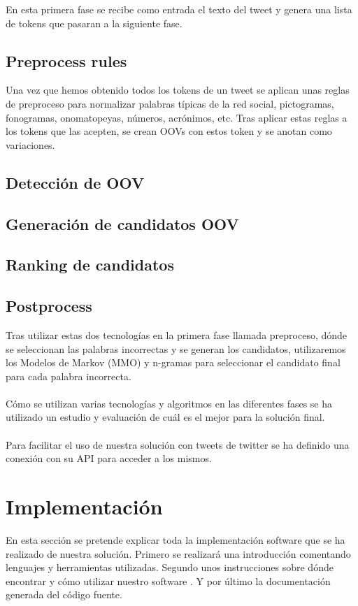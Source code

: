 \documentclass[spanish,12pt, a4paper,twoside]{paper}
\let\oldsection\section
\def\section{\cleardoublepage\oldsection}
\begin{document}
En esta primera fase se recibe como entrada el texto del tweet y genera una lista de tokens que pasaran a la siguiente fase.

\subsection{Preprocess rules}\label{sec:preprocessrules}
Una vez que hemos obtenido todos los tokens de un tweet se aplican unas reglas de preproceso para normalizar palabras típicas de la red social, pictogramas, fonogramas, onomatopeyas, números, acrónimos, etc. Tras aplicar estas reglas a los tokens que las acepten, se crean OOVs con estos token y se anotan como variaciones.

\subsection{Detección de OOV}\label{sec:detecciondeoov}


\subsection{Generación de candidatos OOV}\label{sec:generaciondecandidatosoov}
\subsection{Ranking de candidatos}\label{sec:rankingdecandidatos}
\subsection{Postprocess}\label{sec:postprocess}





Tras utilizar estas dos tecnologías en la primera fase llamada preproceso, dónde se seleccionan las palabras incorrectas y se generan los candidatos, utilizaremos los Modelos de Markov (MMO) y n-gramas para seleccionar el candidato final para cada palabra incorrecta.\\\\
Cómo se utilizan varias tecnologías y algoritmos en las diferentes fases se ha utilizado un estudio y evaluación de cuál es el mejor para la solución final.\\\\
Para facilitar el uso de nuestra solución con tweets de twitter se ha definido una conexión con su API para acceder a los mismos.

\section{Implementación}\label{sec:implementacion}
En esta sección se pretende explicar toda la implementación software que se ha realizado de nuestra solución. Primero se realizará una introducción comentando lenguajes y herramientas utilizadas. Segundo unos instrucciones sobre dónde encontrar y cómo utilizar nuestro software . Y por último la documentación generada del código fuente.
\end{document}
